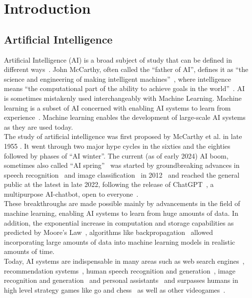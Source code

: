\graphicspath{{img/intro/}}


\chapter{Introduction}
\label{ch:intro}

\section{Artificial Intelligence}
\label{sec:artificial-intelligence}
Artificial Intelligence (AI) is a broad subject of study that can be defined in different ways~\cite[chapter 1]{russell_artificial_2021}.
John McCarthy, often called the “father of AI”\cite{wiki_ai_2023, woo_fatherofai_2014, andresen_fatherofai_2002}, defines it as “the science and engineering of making intelligent machines”~\cite{stanford-whatisai}, where intelligence means “the computational part of the ability to achieve goals in the world”~\cite{stanford-whatisai}.
AI is sometimes mistakenly used interchangeably with Machine Learning.
Machine learning is a subset of AI concerned with enabling AI systems to learn from experience~\cite[chapter 1]{russell_artificial_2021}.
Machine learning enables the development of large-scale AI systems as they are used today.
\\
The study of artificial intelligence was first proposed by McCarthy et al. in late 1955 \cite{mccarthy_proposal_1955}.
It went through two major hype cycles in the sixties and the eighties~\cite{googlengram_ai, wiki_ai_2023, sitnflash_history_2017} followed by phases of “AI winter”.
The current (as of early 2024) AI boom, sometimes also called “AI spring”~\cite{aispring} was started by groundbreaking advances in speech recognition~\cite{hinton_deep_2012} and image classification~\cite{krizhevsky_imagenet_2012} in 2012~\cite{google_decade_2021, house_2012_2019} and reached the general public at the latest in late 2022, following the release of ChatGPT~\cite{openai_chatgpt_intro}, a multipurpose AI-chatbot, open to everyone~\cite{openai_chatgpt}.
\\
These breakthroughs are made possible mainly by advancements in the field of machine learning, enabling AI systems to learn from huge amounts of data.
In addition, the exponential increase in computation and storage capabilities as predicted by Moore’s Law~\cite{mooreslaw}, algorithms like backpropagation~\cite{rumelhart_learning_1986} allowed incorporating large amounts of data into machine learning models in realistic amounts of time.
\\
Today, AI systems are indispensable in many areas such as web search engines~\cite{google_howweuseai}, recommendation systems~\cite{burke_recommender_2011}, human speech recognition and generation~\cite{elevenlabs, hinton_deep_2012}, image recognition and generation~\cite{midjourney, krizhevsky_imagenet_2012} and personal assistants~\cite{openai_chatgpt_intro} and surpasses humans in high level strategy games like go and chess~\cite{silver_mastering_2016, silver_mastering_2017} as well as other videogames~\cite{piper_ai_2019}.

